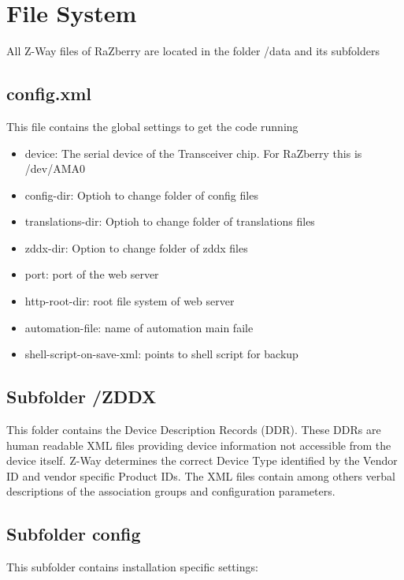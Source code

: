 \section{File System}

All Z-Way files of RaZberry are located in the folder /data and its subfolders

\subsection{config.xml}

This file contains the global settings to get the code running


\begin{itemize}
\item device: The serial device of the Transceiver chip. For RaZberry this is /dev/AMA0
\item config-dir: Optioh to change folder of config files
\item translations-dir: Optioh to change folder of translations files
\item zddx-dir: Option to change folder of zddx files
\item port: port of the web server
\item http-root-dir: root file system of web server
\item automation-file: name of automation main faile
\item shell-script-on-save-xml: points to shell script for backup
\end{itemize}

\subsection{Subfolder /ZDDX}

This folder contains the Device Description Records (DDR). These DDRs are human readable XML files providing device information not accessible from the device itself. Z-Way determines the correct Device Type identified by the Vendor ID and vendor specific Product IDs.  The XML files contain among others verbal descriptions of the association groups and configuration parameters.

\subsection{Subfolder config}

This subfolder contains installation specific settings:

